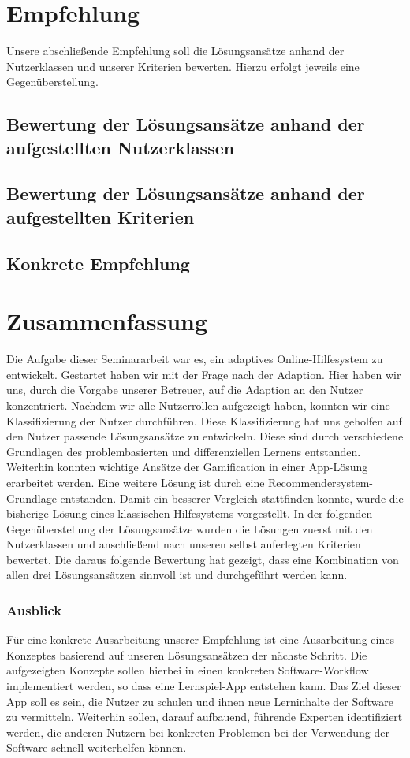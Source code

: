 \chapter{Empfehlung}
Unsere abschließende Empfehlung soll die Lösungsansätze anhand der Nutzerklassen und unserer Kriterien bewerten. Hierzu erfolgt jeweils eine Gegenüberstellung.
\section{Bewertung der Lösungsansätze anhand der aufgestellten Nutzerklassen}
\section{Bewertung der Lösungsansätze anhand der aufgestellten Kriterien}

\section{Konkrete Empfehlung}

\chapter{Zusammenfassung}
Die Aufgabe dieser Seminararbeit war es, ein adaptives Online-Hilfesystem zu entwickelt. Gestartet haben wir mit der Frage nach der Adaption. Hier haben wir uns, durch die Vorgabe unserer Betreuer, auf die Adaption an den Nutzer konzentriert. Nachdem wir alle Nutzerrollen aufgezeigt haben, konnten wir eine Klassifizierung der Nutzer durchführen. Diese Klassifizierung hat uns geholfen auf den Nutzer passende Lösungsansätze zu entwickeln. Diese sind durch verschiedene Grundlagen des problembasierten und differenziellen Lernens entstanden. Weiterhin konnten wichtige Ansätze der Gamification in einer App-Lösung erarbeitet werden. Eine weitere Lösung ist durch eine Recommendersystem-Grundlage entstanden. Damit ein besserer Vergleich stattfinden konnte, wurde die bisherige Lösung eines klassischen Hilfesystems vorgestellt. In der folgenden Gegenüberstellung der Lösungsansätze wurden die Lösungen zuerst mit den Nutzerklassen und anschließend nach unseren selbst auferlegten Kriterien bewertet. Die daraus folgende Bewertung hat gezeigt, dass eine Kombination von allen drei Lösungsansätzen sinnvoll ist und durchgeführt werden kann.

\subsection{Ausblick}
Für eine konkrete Ausarbeitung unserer Empfehlung ist eine Ausarbeitung eines Konzeptes basierend auf unseren Lösungsansätzen der nächste Schritt. Die aufgezeigten Konzepte sollen hierbei in einen konkreten Software-Workflow implementiert werden, so dass eine Lernspiel-App entstehen kann. Das Ziel dieser App soll es sein, die Nutzer zu schulen und ihnen neue Lerninhalte der Software zu vermitteln. Weiterhin sollen, darauf aufbauend, führende Experten identifiziert werden, die anderen Nutzern bei konkreten Problemen bei der Verwendung der Software schnell weiterhelfen können.



